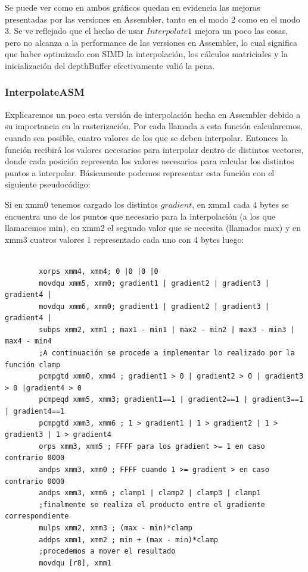 \documentclass[a4paper]{article}
\begin{document}
Se puede ver como en ambos gráficos quedan en evidencia las mejoras presentadas por las versiones en Assembler, tanto en el modo 2 como en el modo 3. Se ve reflejado que el hecho de usar $Interpolate1$ mejora un poco las cosas, pero no alcanza a la performance de las versiones en Assembler, lo cual significa que haber optimizado con SIMD la interpolación, los cálculos matriciales y la inicialización del depthBuffer efectivamente valió la pena.

\subsubsection{InterpolateASM}
Explicaremos un poco esta versión de interpolación hecha en Assembler debido a su importancia en la rasterización. Por cada llamada a esta función calcularemos, cuando sea posible, cuatro valores de los que se deben interpolar. Entonces la función recibirá los valores necesarios para interpolar dentro de distintos vectores, donde cada posición representa los valores necesarios para calcular los distintos puntos a interpolar. Básicamente podemos representar esta función con el siguiente pseudocódigo:

Si en xmm0 tenemos cargado los distintos $gradient$, en xmm1 cada 4 bytes se encuentra uno de los puntos que necesario para la interpolación (a los que llamaremos min), en xmm2 el segundo valor que se necesita (llamados max) y en xmm3 cuatros valores 1 representado cada uno con 4 bytes luego:   
\begin{verbatim}
        
        xorps xmm4, xmm4; 0 |0 |0 |0
        movdqu xmm5, xmm0; gradient1 | gradient2 | gradient3 | gradient4 |      
        movdqu xmm6, xmm0; gradient1 | gradient2 | gradient3 | gradient4 |
        subps xmm2, xmm1 ; max1 - min1 | max2 - min2 | max3 - min3 | max4 - min4 
        ;A continuación se procede a implementar lo realizado por la función clamp
        pcmpgtd xmm0, xmm4 ; gradient1 > 0 | gradient2 > 0 | gradient3 > 0 |gradient4 > 0
        pcmpeqd xmm5, xmm3; gradient1==1 | gradient2==1 | gradient3==1 | gradient4==1  
        pcmpgtd xmm3, xmm6 ; 1 > gradient1 | 1 > gradient2 | 1 > gradient3 | 1 > gradient4
        orps xmm3, xmm5 ; FFFF para los gradient >= 1 en caso contrario 0000  
        andps xmm3, xmm0 ; FFFF cuando 1 >= gradient > en caso contrario 0000
        andps xmm3, xmm6 ; clamp1 | clamp2 | clamp3 | clamp1 
        ;finalmente se realiza el producto entre el gradiente correspondiente
        mulps xmm2, xmm3 ; (max - min)*clamp
        addps xmm1, xmm2 ; min + (max - min)*clamp
        ;procedemos a mover el resultado
        movdqu [r8], xmm1
\end{verbatim}
 
\end{document}
